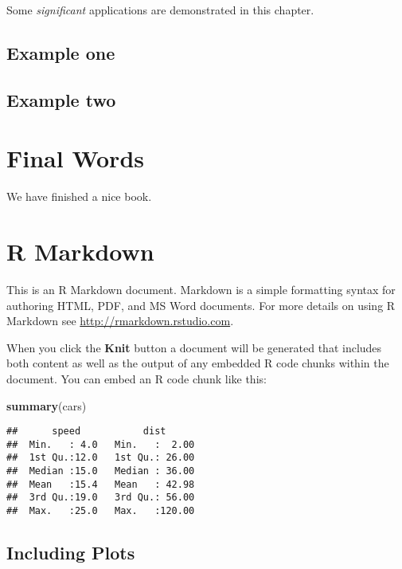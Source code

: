 \documentclass[
  lang=cn,
  11pt,
  scheme=chinese,
  chinesefont=nofont,
  bibstyle=apalike]{elegantbook}
\newenvironment{Shaded}{\begin{snugshade}}{\end{snugshade}}
\newcommand{\KeywordTok}[1]{\textcolor[rgb]{0.13,0.29,0.53}{\textbf{#1}}}
\newcommand{\NormalTok}[1]{#1}
\begin{document}
Some \emph{significant} applications are demonstrated in this chapter.

\hypertarget{example-one}{%
\section{Example one}\label{example-one}}

\hypertarget{example-two}{%
\section{Example two}\label{example-two}}

\hypertarget{final-words}{%
\chapter{Final Words}\label{final-words}}

We have finished a nice book.

\hypertarget{appendix}{%
\appendix}


\hypertarget{r-markdown}{%
\chapter{R Markdown}\label{r-markdown}}

This is an R Markdown document. Markdown is a simple formatting syntax for authoring HTML, PDF, and MS Word documents. For more details on using R Markdown see \url{http://rmarkdown.rstudio.com}.

When you click the \textbf{Knit} button a document will be generated that includes both content as well as the output of any embedded R code chunks within the document. You can embed an R code chunk like this:

\begin{Shaded}
\begin{Highlighting}[]
\KeywordTok{summary}\NormalTok{(cars)}
\end{Highlighting}
\end{Shaded}

\begin{verbatim}
##      speed           dist       
##  Min.   : 4.0   Min.   :  2.00  
##  1st Qu.:12.0   1st Qu.: 26.00  
##  Median :15.0   Median : 36.00  
##  Mean   :15.4   Mean   : 42.98  
##  3rd Qu.:19.0   3rd Qu.: 56.00  
##  Max.   :25.0   Max.   :120.00
\end{verbatim}

\hypertarget{including-plots}{%
\section{Including Plots}\label{including-plots}}
\end{document}
